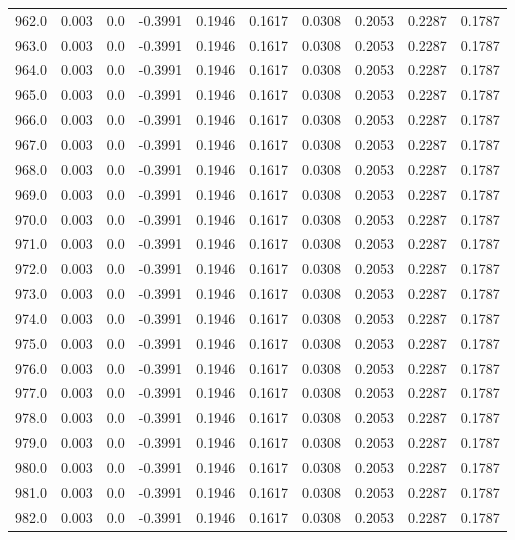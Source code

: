 \begin{longtable}{lrrrrrrrrr}
962.0 & 0.003 & 0.0 & -0.3991 & 0.1946 & 0.1617 & 0.0308 & 0.2053 & 0.2287 & 0.1787 \\
963.0 & 0.003 & 0.0 & -0.3991 & 0.1946 & 0.1617 & 0.0308 & 0.2053 & 0.2287 & 0.1787 \\
964.0 & 0.003 & 0.0 & -0.3991 & 0.1946 & 0.1617 & 0.0308 & 0.2053 & 0.2287 & 0.1787 \\
965.0 & 0.003 & 0.0 & -0.3991 & 0.1946 & 0.1617 & 0.0308 & 0.2053 & 0.2287 & 0.1787 \\
966.0 & 0.003 & 0.0 & -0.3991 & 0.1946 & 0.1617 & 0.0308 & 0.2053 & 0.2287 & 0.1787 \\
967.0 & 0.003 & 0.0 & -0.3991 & 0.1946 & 0.1617 & 0.0308 & 0.2053 & 0.2287 & 0.1787 \\
968.0 & 0.003 & 0.0 & -0.3991 & 0.1946 & 0.1617 & 0.0308 & 0.2053 & 0.2287 & 0.1787 \\
969.0 & 0.003 & 0.0 & -0.3991 & 0.1946 & 0.1617 & 0.0308 & 0.2053 & 0.2287 & 0.1787 \\
970.0 & 0.003 & 0.0 & -0.3991 & 0.1946 & 0.1617 & 0.0308 & 0.2053 & 0.2287 & 0.1787 \\
971.0 & 0.003 & 0.0 & -0.3991 & 0.1946 & 0.1617 & 0.0308 & 0.2053 & 0.2287 & 0.1787 \\
972.0 & 0.003 & 0.0 & -0.3991 & 0.1946 & 0.1617 & 0.0308 & 0.2053 & 0.2287 & 0.1787 \\
973.0 & 0.003 & 0.0 & -0.3991 & 0.1946 & 0.1617 & 0.0308 & 0.2053 & 0.2287 & 0.1787 \\
974.0 & 0.003 & 0.0 & -0.3991 & 0.1946 & 0.1617 & 0.0308 & 0.2053 & 0.2287 & 0.1787 \\
975.0 & 0.003 & 0.0 & -0.3991 & 0.1946 & 0.1617 & 0.0308 & 0.2053 & 0.2287 & 0.1787 \\
976.0 & 0.003 & 0.0 & -0.3991 & 0.1946 & 0.1617 & 0.0308 & 0.2053 & 0.2287 & 0.1787 \\
977.0 & 0.003 & 0.0 & -0.3991 & 0.1946 & 0.1617 & 0.0308 & 0.2053 & 0.2287 & 0.1787 \\
978.0 & 0.003 & 0.0 & -0.3991 & 0.1946 & 0.1617 & 0.0308 & 0.2053 & 0.2287 & 0.1787 \\
979.0 & 0.003 & 0.0 & -0.3991 & 0.1946 & 0.1617 & 0.0308 & 0.2053 & 0.2287 & 0.1787 \\
980.0 & 0.003 & 0.0 & -0.3991 & 0.1946 & 0.1617 & 0.0308 & 0.2053 & 0.2287 & 0.1787 \\
981.0 & 0.003 & 0.0 & -0.3991 & 0.1946 & 0.1617 & 0.0308 & 0.2053 & 0.2287 & 0.1787 \\
982.0 & 0.003 & 0.0 & -0.3991 & 0.1946 & 0.1617 & 0.0308 & 0.2053 & 0.2287 & 0.1787 \\

\end{longtable}
